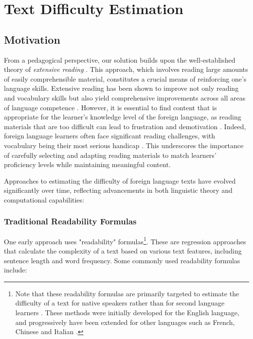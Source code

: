 \section{Text Difficulty Estimation}\label{sec:difficulty_estimation}

\subsection{Motivation}

From a pedagogical perspective, our solution builds upon the well-established theory of \textit{extensive reading} \cite{daybamford2002,krashen2004power}. This approach, which involves reading large amounts of easily comprehensible material, constitutes a crucial means of reinforcing one's language skills. Extensive reading has been shown to improve not only reading and vocabulary skills but also yield comprehensive improvements across all areas of language competence \cite{Nation2019Teaching}. However, it is essential to find content that is appropriate for the learner's knowledge level of the foreign language, as reading materials that are too difficult can lead to frustration and demotivation \cite{Schulz1981Literature}. Indeed, foreign language learners often face significant reading challenges, with vocabulary being their most serious handicap \cite{Yorio1971Some}. This underscores the importance of carefully selecting and adapting reading materials to match learners' proficiency levels while maintaining meaningful content.

Approaches to estimating the difficulty of foreign language texts have evolved significantly over time, reflecting advancements in both linguistic theory and computational capabilities:

\subsubsection{Traditional Readability Formulas}

One early approach uses "readability" formulas\footnote{Note that these readability formulas are primarily targeted to estimate the difficulty of a text for native speakers rather than for second language learners \cite{xia2019text}. These methods were initially developed for the English language, and progressively have been extended for other languages such as French, Chinese and Italian \cite{okinina2020ctap,chen2016ctap}.}. These are regression approaches that calculate the complexity of a text based on various text features, including sentence length and word frequency. Some commonly used readability formulas include:

